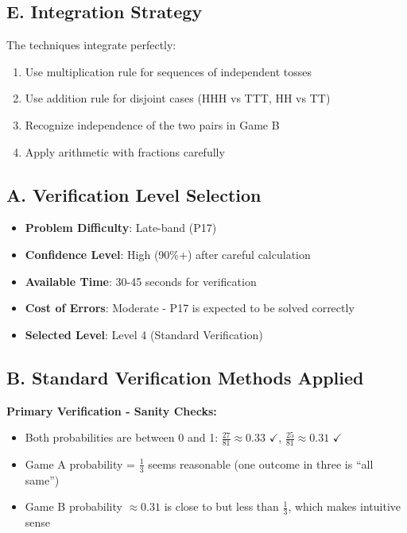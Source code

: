 \documentclass[]{article}
\begin{document}
\begin{techniquesbox}
\subsection*{E. Integration Strategy}
The techniques integrate perfectly:
\begin{enumerate}
    \item Use multiplication rule for sequences of independent tosses
    \item Use addition rule for disjoint cases (HHH vs TTT, HH vs TT)
    \item Recognize independence of the two pairs in Game B
    \item Apply arithmetic with fractions carefully
\end{enumerate}
\end{techniquesbox}

\begin{verificationbox}
\subsection*{A. Verification Level Selection}
\begin{itemize}[leftmargin=*]
    \item \textbf{Problem Difficulty}: Late-band (P17)
    \item \textbf{Confidence Level}: High (90\%+) after careful calculation
    \item \textbf{Available Time}: 30-45 seconds for verification
    \item \textbf{Cost of Errors}: Moderate - P17 is expected to be solved correctly
    \item \textbf{Selected Level}: Level 4 (Standard Verification)
\end{itemize}

\subsection*{B. Standard Verification Methods Applied}

\textbf{Primary Verification - Sanity Checks:}
\begin{itemize}[leftmargin=*]
    \item Both probabilities are between 0 and 1: $\frac{27}{81} \approx 0.33$ $\checkmark$, $\frac{25}{81} \approx 0.31$ $\checkmark$
    \item Game A probability = $\frac{1}{3}$ seems reasonable (one outcome in three is ``all same'')
    \item Game B probability $\approx 0.31$ is close to but less than $\frac{1}{3}$, which makes intuitive sense
\end{itemize}


\end{verificationbox}
\end{document}
